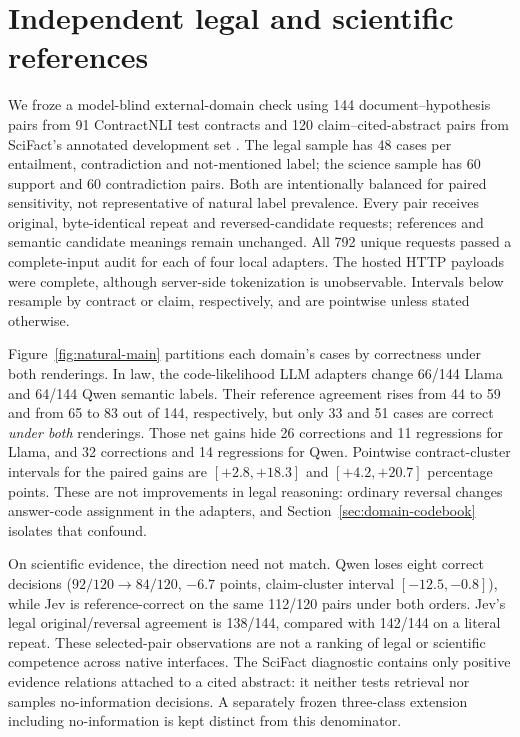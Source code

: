 \section{Independent legal and scientific references}
\label{sec:natural-domains}
We froze a model-blind external-domain check using 144 document--hypothesis pairs from 91 ContractNLI test contracts \citep{contractnli} and 120 claim--cited-abstract pairs from SciFact's annotated development set \citep{scifact}. The legal sample has 48 cases per entailment, contradiction and not-mentioned label; the science sample has 60 support and 60 contradiction pairs. Both are intentionally balanced for paired sensitivity, not representative of natural label prevalence. Every pair receives original, byte-identical repeat and reversed-candidate requests; references and semantic candidate meanings remain unchanged. All 792 unique requests passed a complete-input audit for each of four local adapters. The hosted HTTP payloads were complete, although server-side tokenization is unobservable. Intervals below resample by contract or claim, respectively, and are pointwise unless stated otherwise.

Figure~\ref{fig:natural-main} partitions each domain's cases by correctness under both renderings. In law, the code-likelihood LLM adapters change 66/144 Llama and 64/144 Qwen semantic labels. Their reference agreement rises from 44 to 59 and from 65 to 83 out of 144, respectively, but only 33 and 51 cases are correct \emph{under both} renderings. Those net gains hide 26 corrections and 11 regressions for Llama, and 32 corrections and 14 regressions for Qwen. Pointwise contract-cluster intervals for the paired gains are $[+2.8,+18.3]$ and $[+4.2,+20.7]$ percentage points. These are not improvements in legal reasoning: ordinary reversal changes answer-code assignment in the adapters, and Section~\ref{sec:domain-codebook} isolates that confound.

On scientific evidence, the direction need not match. Qwen loses eight correct decisions ($92/120\to84/120$, $-6.7$ points, claim-cluster interval $[-12.5,-0.8]$), while Jev is reference-correct on the same 112/120 pairs under both orders. Jev's legal original/reversal agreement is 138/144, compared with 142/144 on a literal repeat. These selected-pair observations are not a ranking of legal or scientific competence across native interfaces. The SciFact diagnostic contains only positive evidence relations attached to a cited abstract: it neither tests retrieval nor samples no-information decisions. A separately frozen three-class extension including no-information is kept distinct from this denominator.


